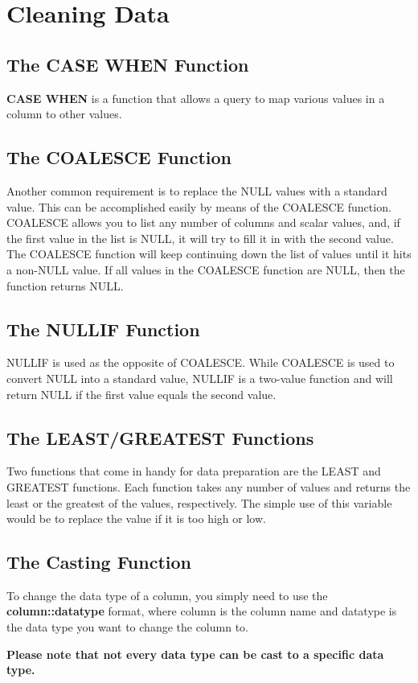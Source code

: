 \section{Cleaning Data}
\subsection{The CASE WHEN Function}
\textbf{CASE WHEN} is a function that allows a query to map various values in a column to other values.

\subsection{The COALESCE Function}
Another common requirement is to replace the NULL values with a standard value. This can be accomplished easily by means of the COALESCE function. COALESCE allows you to list any number of columns and scalar values, and, if the first value in the list is NULL, it will try to fill it in with the second value. The COALESCE function will keep continuing down the list of values until it hits a non-NULL value. If all values in the COALESCE function are NULL, then the function returns NULL.

\subsection{The NULLIF Function}
NULLIF is used as the opposite of COALESCE. While COALESCE is used to convert NULL into a standard value, NULLIF is a two-value function and will return NULL if the first value equals the second value.
\subsection{The LEAST/GREATEST Functions}
Two functions that come in handy for data preparation are the LEAST and GREATEST functions. Each function takes any number of values and returns the least or the greatest of the values, respectively. The simple use of this variable would be to replace the value if it is too high or low.
\subsection{The Casting Function}
To change the data type of a column, you simply need to use the \textbf{column::datatype} format, where column is the column name and datatype is the data type you want to change the column to.

\textbf{Please note that not every data type can be cast to a specific data type.}
